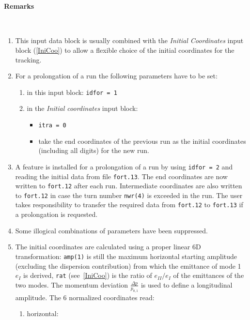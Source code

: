 \paragraph{Remarks}~
\begin{enumerate}
    \item This input data block is usually combined with the \textit{Initial Coordinates} input block (\ref{IniCoo}) to allow a flexible choice of the initial coordinates for the tracking.
    \item For a prolongation of a run the following parameters have to be set:
    \begin{enumerate}
        \item in this input block: \texttt{idfor = 1}
        \item in the \textit{Initial coordinates} input block:
        \begin{itemize}
            \item \texttt{itra = 0}
            \item take the end coordinates of the previous run as the initial coordinates (including all digits) for the new run.
        \end{itemize}
    \end{enumerate}
    \item A feature is installed for a prolongation of a run by using \texttt{idfor = 2} and reading the initial data from file \texttt{fort.13}. The end coordinates are now written to \texttt{fort.12} after each run. Intermediate coordinates are also written to \texttt{fort.12} in case the turn number \texttt{nwr(4)} is exceeded in the run. The user takes responsibility to transfer the required data from \texttt{fort.12} to \texttt{fort.13} if a prolongation is requested.
    \item Some illogical combinations of parameters have been suppressed.
    \item The initial coordinates are calculated using a proper linear 6D transformation: \texttt{amp(1)} is still the maximum horizontal starting amplitude (excluding the dispersion contribution) from which the emittance of mode 1 $e_I$ is derived, \texttt{rat} (see~\ref{IniCoo}) is the ratio of $e_{II}/e_I$ of the emittances of the two modes. The momentum deviation $\frac{\Delta p}{p_{0,1}}$ is used to define a longitudinal amplitude. The 6 normalized coordinates read:
        \begin{enumerate}
            \item horizontal:\\

\end{enumerate}
\end{enumerate}
